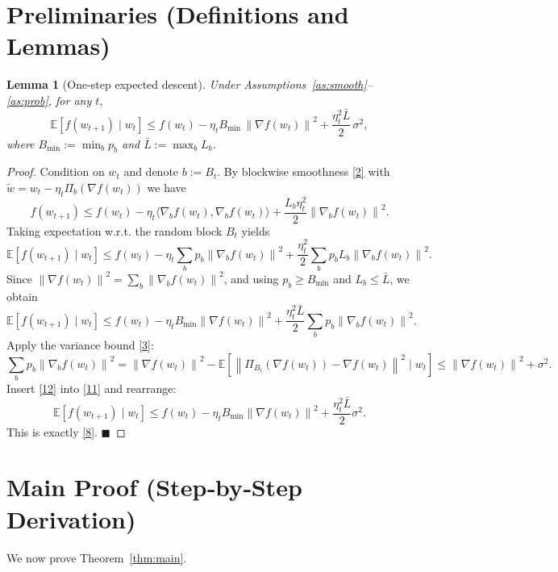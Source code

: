 \documentclass{article}
\newtheorem{lemma}{Lemma}
\newcommand{\E}{\mathbb{E}}
\newcommand{\norm}[1]{\left\|#1\right\|}
\begin{document}
\section*{Preliminaries (Definitions and Lemmas)}
\begin{lemma}[One‑step expected descent]\label{lem:descent}
Under Assumptions~\ref{as:smooth}–\ref{as:prob}, for any $t$,
\[
\E\!\left[ f(w_{t+1})\mid w_{t}\right]
\le f(w_{t})
-\eta_{t}B_{\min}\,\norm{\nabla f(w_{t})}^{2}
+\frac{\eta_{t}^{2}\bar L}{2}\,\sigma^{2},
\tag{8}
\]
where $B_{\min}:=\min_{b}p_{b}$ and $\bar L:=\max_{b}L_{b}$.
\end{lemma}
\begin{proof}
Condition on $w_{t}$ and denote $b:=B_{t}$. By blockwise smoothness \eqref{2} with $\tilde w=w_{t}-\eta_{t}\Pi_{b}(\nabla f(w_{t}))$ we have
\[
f(w_{t+1})
\le f(w_{t})-\eta_{t}\langle\nabla_{b}f(w_{t}),\nabla_{b}f(w_{t})\rangle
+\frac{L_{b}\eta_{t}^{2}}{2}\norm{\nabla_{b}f(w_{t})}^{2}.
\tag{9}
\]
Taking expectation w.r.t. the random block $B_{t}$ yields
\[
\E\!\left[f(w_{t+1})\mid w_{t}\right]
\le f(w_{t})-\eta_{t}\sum_{b}p_{b}\norm{\nabla_{b}f(w_{t})}^{2}
+\frac{\eta_{t}^{2}}{2}\sum_{b}p_{b}L_{b}\norm{\nabla_{b}f(w_{t})}^{2}.
\tag{10}
\]
Since $\norm{\nabla f(w_{t})}^{2}= \sum_{b}\norm{\nabla_{b}f(w_{t})}^{2}$,
and using $p_{b}\ge B_{\min}$ and $L_{b}\le \bar L$, we obtain
\[
\E\!\left[f(w_{t+1})\mid w_{t}\right]
\le f(w_{t})-\eta_{t}B_{\min}\norm{\nabla f(w_{t})}^{2}
+\frac{\eta_{t}^{2}\bar L}{2}\sum_{b}p_{b}\norm{\nabla_{b}f(w_{t})}^{2}.
\tag{11}
\]
Apply the variance bound \eqref{3}:
\[
\sum_{b}p_{b}\norm{\nabla_{b}f(w_{t})}^{2}
=\norm{\nabla f(w_{t})}^{2}
-\E\!\left[\norm{\Pi_{B_{t}}(\nabla f(w_{t}))-\nabla f(w_{t})}^{2}\mid w_{t}\right]
\le \norm{\nabla f(w_{t})}^{2}+\sigma^{2}.
\tag{12}
\]
Insert \eqref{12} into \eqref{11} and rearrange:
\[
\E\!\left[f(w_{t+1})\mid w_{t}\right]
\le f(w_{t})-\eta_{t}B_{\min}\norm{\nabla f(w_{t})}^{2}
+\frac{\eta_{t}^{2}\bar L}{2}\sigma^{2}.
\tag{13}
\]
This is exactly \eqref{8}. \hfill$\blacksquare$
\end{proof}

\section*{Main Proof (Step‑by‑Step Derivation)}
We now prove Theorem~\ref{thm:main}.  
\end{document}

